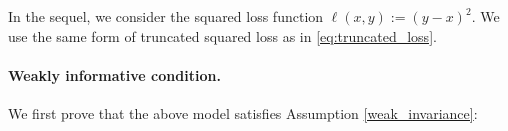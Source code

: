 
In the sequel, we consider the squared loss function $\ell(x,y):=(y-x)^2$. We use the same form of truncated squared loss as in \eqref{eq:truncated_loss}.









\paragraph{Weakly informative condition.}
We first prove that the above model satisfies Assumption \ref{weak_invariance}:

